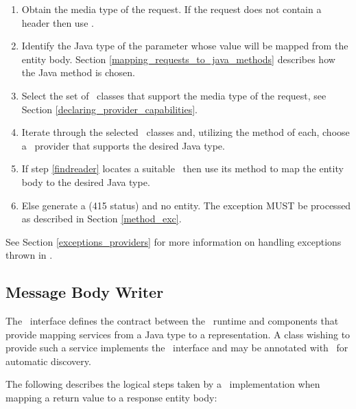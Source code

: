 \begin{enumerate}
\item Obtain the media type of the request. If the request does not contain a  header then use .
\item Identify the Java type of the parameter whose value will be mapped from the entity body. Section \ref{mapping_requests_to_java_methods} describes how the Java method is chosen.
\item Select the set of \MsgRead\ classes that support the media type of the request, see Section \ref{declaring_provider_capabilities}.
\item\label{findreader} Iterate through the selected \MsgRead\ classes and, utilizing the  method of each, choose a \MsgRead\ provider that supports the desired Java type.
\item If step \ref{findreader} locates a suitable \MsgRead\ then use its  method to map the entity body to the desired Java type.
\item Else generate a  (415 status) and no entity. The exception MUST be processed as described in Section \ref{method_exc}.
\end{enumerate}

See Section \ref{exceptions_providers} for more information on handling exceptions thrown in \MsgRead{}.

\subsection{Message Body Writer}
\label{message_body_writer}

The \MsgWrite\ interface defines the contract between the \jaxrs\ runtime and components that provide mapping services from a Java type to a representation. A class wishing to provide such a service implements the \MsgWrite\ interface and may be annotated with \Provider\ for automatic discovery.

The following describes the logical steps taken by a \jaxrs\ implementation when mapping a return value to a response entity body:

